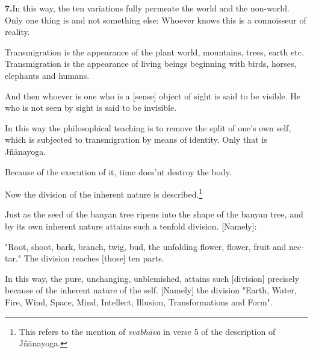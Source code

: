 \begin{otherlanguage}{english}
\begin{tlate}
    \textbf{7.}In this way, the ten variations fully permeate the world and the non-world.
     Only one thing is and not something else: Whoever knows this is a connoisseur of reality. \\
  \end{tlate}
 \begin{tlate}
   Transmigration is the appearance of the plant world, mountains, trees, earth etc. Transmigration is the appearance of living beings beginning with birds, horses, elephants and humans.
 \end{tlate}
  \begin{tlate}
    And then whoever is one who is a [sense] object of sight is said to be visible. He who is not seen by sight is said to be invisible.
  \end{tlate}
\begin{tlate}
  In this way the philosophical teaching is to remove the split of one's own self, which is subjected to transmigration by means of identity. Only that is Jñānayoga.
\end{tlate}
\begin{tlate}
\noindent Because of the execution of it, time does'nt destroy the body. \\
\end{tlate}
\begin{tlate}    
Now the division of the inherent nature is described.\footnote{This refers to the mention of \textit{svabhāva} in verse 5 of the description of Jñānayoga.}
\end{tlate}
\begin{tlate}
\noindent Just as the seed of the banyan tree ripens into the shape of the banyan tree, and by its own inherent nature attains such a tenfold division. [Namely]:
\end{tlate}
\begin{tlate}
\noindent "Root, shoot, bark, branch, twig, bud, the unfolding flower, flower, fruit and nectar." The division reaches [those] ten parts.
\end{tlate}
\begin{tlate}
\noindent In this way, the pure, unchanging, unblemished, attains such [division] precisely because of the inherent nature of the self. [Namely] the division "Earth, Water, Fire, Wind, Space, Mind, Intellect, Illusion, Transformations and Form".

\end{tlate}
\end{otherlanguage}
